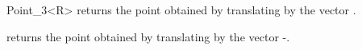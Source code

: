 \begin{ccRefClass} {Point_3<R>}
       {returns the point obtained by translating  by the 
        vector .}

       {returns the point obtained by translating  by the 
        vector -.}

\ccSeeAlso


\end{ccRefClass} 

